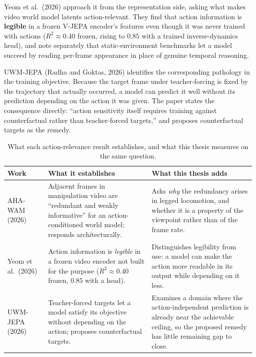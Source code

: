 \documentclass[12pt,a4paper,oneside]{report}
\begin{document}
Yeom et al.\ (2026) approach it from the representation side, asking what makes video world model
latents action-relevant. They find that action information is \textbf{legible} in a frozen V-JEPA
encoder's features even though it was never trained with actions ($R^2 \approx 0.40$ frozen, rising to
$0.85$ with a trained inverse-dynamics head), and note separately that static-environment benchmarks
let a model succeed by reading per-frame appearance in place of genuine temporal reasoning.

UWM-JEPA (Radha and Goktas, 2026) identifies the corresponding pathology in the training objective.
Because the target frame under teacher-forcing is fixed by the trajectory that actually occurred, a
model can predict it well without its prediction depending on the action it was given. The paper
states the consequence directly: ``action sensitivity itself requires training against counterfactual
rather than teacher-forced targets,'' and proposes counterfactual targets as the remedy.

\begin{table}[H]
\centering
\footnotesize
\setlength{\tabcolsep}{4pt}
\caption{What each action-relevance result establishes, and what this thesis measures on the same
question.}
\label{tab:action-relevance}
\begin{tabularx}{\textwidth}{>{\hsize}Y>{\hsize}Y>{\hsize}Y}
\hline
\textbf{Work} & \textbf{What it establishes} & \textbf{What this thesis adds}\\
\hline
AHA-WAM (2026) & Adjacent frames in manipulation video are ``redundant and weakly informative'' for an
  action-conditioned world model; responds architecturally. & Asks \emph{why} the redundancy arises in
  legged locomotion, and whether it is a property of the viewpoint rather than of the frame rate.\\
Yeom et al.\ (2026) & Action information is \emph{legible} in a frozen video encoder not built for the
  purpose ($R^2\!\approx\!0.40$ frozen, $0.85$ with a head). & Distinguishes legibility from use: a
  model can make the action more readable in its output while depending on it less.\\
UWM-JEPA (2026) & Teacher-forced targets let a model satisfy its objective without depending on the
  action; proposes counterfactual targets. & Examines a domain where the action-independent prediction
  is already near the achievable ceiling, so the proposed remedy has little remaining gap to close.\\
\hline
\end{tabularx}
\end{table}
\end{document}
